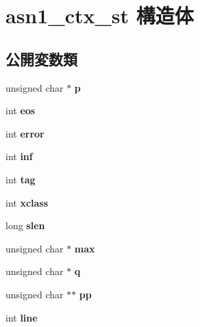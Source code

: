 \hypertarget{structasn1__ctx__st}{}\section{asn1\+\_\+ctx\+\_\+st 構造体}
\label{structasn1__ctx__st}
\subsection*{公開変数類}
\begin{DoxyCompactItemize}
\item 
\hypertarget{structasn1__ctx__st_a4055e8e978696b3ebe48663e27aaccfd}{}unsigned char $\ast$ {\bfseries p}\label{structasn1__ctx__st_a4055e8e978696b3ebe48663e27aaccfd}

\item 
\hypertarget{structasn1__ctx__st_acfa7be33fd2e45713f6ae576c929c8fc}{}int {\bfseries eos}\label{structasn1__ctx__st_acfa7be33fd2e45713f6ae576c929c8fc}

\item 
\hypertarget{structasn1__ctx__st_ad615bc5c2f51b7b53714efab6848410e}{}int {\bfseries error}\label{structasn1__ctx__st_ad615bc5c2f51b7b53714efab6848410e}

\item 
\hypertarget{structasn1__ctx__st_a3c7aed3d59e1266f44363d75532b3c37}{}int {\bfseries inf}\label{structasn1__ctx__st_a3c7aed3d59e1266f44363d75532b3c37}

\item 
\hypertarget{structasn1__ctx__st_a50c207efa22cdc9e926f70c3e05ebd8b}{}int {\bfseries tag}\label{structasn1__ctx__st_a50c207efa22cdc9e926f70c3e05ebd8b}

\item 
\hypertarget{structasn1__ctx__st_a13d5a9bd152573c46b088acac3f7671f}{}int {\bfseries xclass}\label{structasn1__ctx__st_a13d5a9bd152573c46b088acac3f7671f}

\item 
\hypertarget{structasn1__ctx__st_ae23813e92662ef3caff611c92fe51879}{}long {\bfseries slen}\label{structasn1__ctx__st_ae23813e92662ef3caff611c92fe51879}

\item 
\hypertarget{structasn1__ctx__st_a22989e6f8850b237b7982c8f1c3f27a1}{}unsigned char $\ast$ {\bfseries max}\label{structasn1__ctx__st_a22989e6f8850b237b7982c8f1c3f27a1}

\item 
\hypertarget{structasn1__ctx__st_a2b0e6ae963399039db4a27f09ade7e41}{}unsigned char $\ast$ {\bfseries q}\label{structasn1__ctx__st_a2b0e6ae963399039db4a27f09ade7e41}

\item 
\hypertarget{structasn1__ctx__st_a1f8419ae235a22405868d87136f3b098}{}unsigned char $\ast$$\ast$ {\bfseries pp}\label{structasn1__ctx__st_a1f8419ae235a22405868d87136f3b098}

\item 
\hypertarget{structasn1__ctx__st_adc9183c7070fe39aeff12711311c76b4}{}int {\bfseries line}\label{structasn1__ctx__st_adc9183c7070fe39aeff12711311c76b4}

\end{DoxyCompactItemize}


